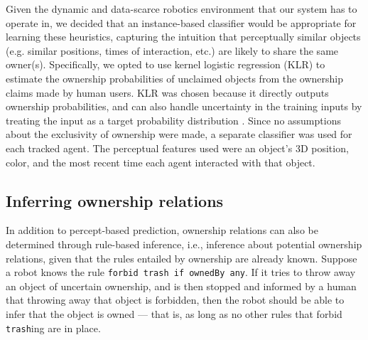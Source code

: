 \documentclass[letterpaper]{article} %
\begin{document}
Given the dynamic and data-scarce robotics environment that our system has to operate in, we decided that an instance-based classifier would be appropriate for learning these heuristics, capturing the intuition that perceptually similar objects (e.g. similar positions, times of interaction, etc.) are likely to share the same owner(s). Specifically, we opted to use kernel logistic regression (KLR) \cite{zhu2005kernel} to estimate the ownership probabilities of unclaimed objects from the ownership claims made by human users. KLR was chosen because it directly outputs ownership probabilities, and can also handle uncertainty in the training inputs by treating the input as a target probability distribution \cite{magder1997logistic}. Since no assumptions about the exclusivity of ownership were made, a separate classifier was used for each tracked agent. The perceptual features used were an object's 3D position, color, and the most recent time each agent interacted with that object.

\subsection{Inferring ownership relations}

In addition to percept-based prediction, ownership relations can also be determined through rule-based inference, i.e., inference about potential ownership relations, given that the rules entailed by ownership are already known. Suppose a robot knows the rule \texttt{\small{forbid trash if ownedBy any}}. If it tries to throw away an object of uncertain ownership, and is then stopped and informed by a human that throwing away that object is forbidden, then the robot should be able to infer that the object is owned --- that is, as long as no other rules that forbid \texttt{\small{trash}}ing are in place.
\end{document}
